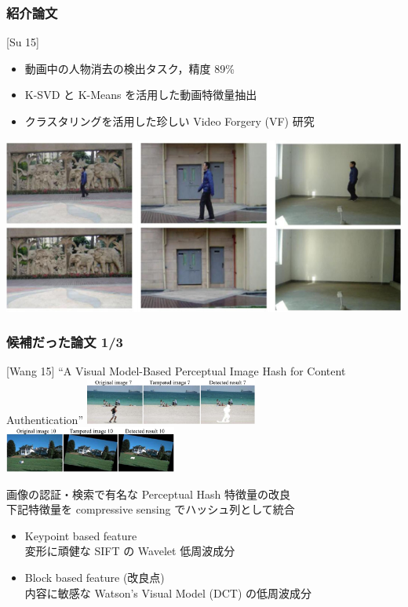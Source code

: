 \begin{frame}[plain]\frametitle{}
\titlepage %
\end{frame}


\begin{frame}\frametitle{紹介論文}
\begin{block}{[Su 15]}
\end{block}
\begin{itemize}
    \item 動画中の人物消去の検出タスク，精度 89\%
    \item K-SVD と K-Means を活用した動画特徴量抽出
    \item クラスタリングを活用した珍しい Video Forgery (VF) 研究
\end{itemize}
\includegraphics[scale=0.3]{figure/su.png}
\end{frame}


\begin{frame}\frametitle{候補だった論文 1/3}
\begin{block}{[Wang 15]}
``A Visual Model-Based Perceptual Image Hash for Content Authentication''
\cite{Wang2015}
\includegraphics[height=1.5cm]{figure/wang0.png}
\includegraphics[height=1.5cm]{figure/wang1.png}
\end{block}
画像の認証・検索で有名な Perceptual Hash 特徴量の改良 \\
下記特徴量を compressive sensing でハッシュ列として統合
\begin{itemize}
    \item Keypoint based feature \\
        変形に頑健な SIFT の Wavelet 低周波成分
    \item Block based feature (改良点) \\
        内容に敏感な Watson's Visual Model (DCT) の低周波成分
\end{itemize}
\end{frame}


